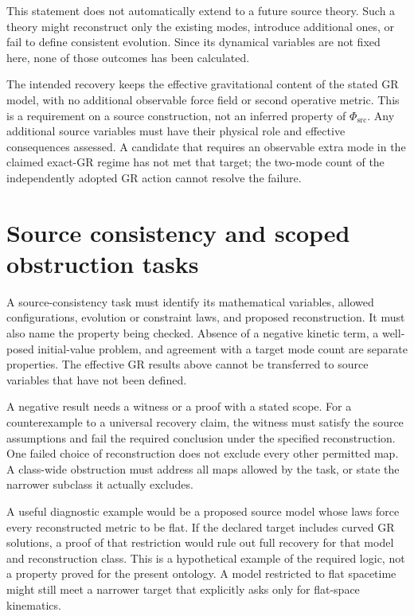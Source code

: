\documentclass[11pt,oneside]{report}
\newcommand{\PhiSrc}{\Phi_{\mathrm{src}}}
\theoremstyle{remark}
\numberwithin{definition}{chapter}
\numberwithin{proposition}{chapter}
\numberwithin{remark}{chapter}
\begin{document}
This statement does not automatically extend to a future source theory. Such a theory might reconstruct only the existing modes, introduce additional ones, or fail to define consistent evolution. Since its dynamical variables are not fixed here, none of those outcomes has been calculated.

The intended recovery keeps the effective gravitational content of the stated GR model, with no additional observable force field or second operative metric. This is a requirement on a source construction, not an inferred property of $\PhiSrc$. Any additional source variables must have their physical role and effective consequences assessed. A candidate that requires an observable extra mode in the claimed exact-GR regime has not met that target; the two-mode count of the independently adopted GR action cannot resolve the failure.

\section{Source consistency and scoped obstruction tasks}
A source-consistency task must identify its mathematical variables, allowed configurations, evolution or constraint laws, and proposed reconstruction. It must also name the property being checked. Absence of a negative kinetic term, a well-posed initial-value problem, and agreement with a target mode count are separate properties. The effective GR results above cannot be transferred to source variables that have not been defined.

A negative result needs a witness or a proof with a stated scope. For a counterexample to a universal recovery claim, the witness must satisfy the source assumptions and fail the required conclusion under the specified reconstruction. One failed choice of reconstruction does not exclude every other permitted map. A class-wide obstruction must address all maps allowed by the task, or state the narrower subclass it actually excludes.

A useful diagnostic example would be a proposed source model whose laws force every reconstructed metric to be flat. If the declared target includes curved GR solutions, a proof of that restriction would rule out full recovery for that model and reconstruction class. This is a hypothetical example of the required logic, not a property proved for the present ontology. A model restricted to flat spacetime might still meet a narrower target that explicitly asks only for flat-space kinematics.
\end{document}
